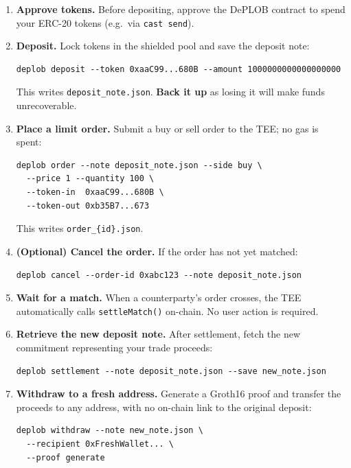 \documentclass[12pt,a4paper]{article}
\begin{document}
\begin{enumerate}
    \item \textbf{Approve tokens.} Before depositing, approve the DePLOB contract to spend your ERC-20 tokens (e.g.\ via \texttt{cast send}).

    \item \textbf{Deposit.} Lock tokens in the shielded pool and save the deposit note:
    \begin{verbatim}
deplob deposit --token 0xaaC99...680B --amount 1000000000000000000
    \end{verbatim}
    This writes \texttt{deposit\_note.json}.  \textbf{Back it up} as losing it will make funds unrecoverable.

    \item \textbf{Place a limit order.} Submit a buy or sell order to the TEE; no gas is spent:
    \begin{verbatim}
deplob order --note deposit_note.json --side buy \
  --price 1 --quantity 100 \
  --token-in  0xaaC99...680B \
  --token-out 0xb35B7...673
    \end{verbatim}
    This writes \texttt{order\_\{id\}.json}.

    \item \textbf{(Optional) Cancel the order.} If the order has not yet matched:
    \begin{verbatim}
deplob cancel --order-id 0xabc123 --note deposit_note.json
    \end{verbatim}

    \item \textbf{Wait for a match.} When a counterparty's order crosses, the TEE automatically calls \texttt{settleMatch()} on-chain.  No user action is required.

    \item \textbf{Retrieve the new deposit note.} After settlement, fetch the new commitment representing your trade proceeds:
    \begin{verbatim}
deplob settlement --note deposit_note.json --save new_note.json
    \end{verbatim}

    \item \textbf{Withdraw to a fresh address.} Generate a Groth16 proof and transfer the proceeds to any address, with no on-chain link to the original deposit:
    \begin{verbatim}
deplob withdraw --note new_note.json \
  --recipient 0xFreshWallet... \
  --proof generate
    \end{verbatim}
\end{enumerate}
\end{document}
